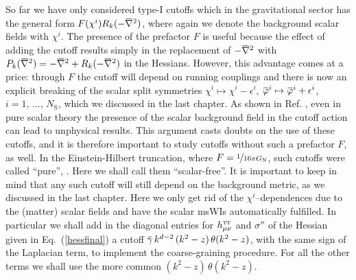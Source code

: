 \documentclass[11pt]{book} %
\newcommand{\overbar}[1]{\mkern 1.5mu\overline{\mkern-1.5mu#1\mkern-1.5mu}\mkern 1.5mu}
\newcommand\TTspace{ -1pt }
\newcommand\hTTmunu{ h^{\scriptscriptstyle{\mathrm{T\hspace{\TTspace}T}}}_{\mu\nu} }
\newcommand\NS{ N_{\scriptscriptstyle{\mathrm{S}}} }
\newcommand\GNewton{ G_{\scriptscriptstyle{\mathrm{N}}} }
\newcommand{\bnabla}{\overbar \nabla}
\newcommand{\bp}{\overbar \varphi}
\newcommand{\bg}{\overbar \gamma}
\newcommand\eg{\textit{e.g.}\ }
\numberwithin{equation}{chapter}
\begin{document}
So far we have only considered type-I cutoffs which in the gravitational
sector has the general form $F(\chi^i)R_k(-\bnabla^2)$, where again we denote
the background scalar fields with $\chi^i$.
The presence of the prefactor $F$ is useful because the effect
of adding the cutoff results simply in the replacement of
$-\bnabla^2$ with $P_k(\bnabla^2)=-\bnabla^2+R_k(-\bnabla^2)$
in the Hessians.
However, this advantage comes at a price:
through $F$ the cutoff will depend on running couplings
and there is now an explicit breaking of the scalar split symmetries
$\chi^i \mapsto \chi^i - \epsilon^i$,
$\bp ^i \mapsto \bp ^i + \epsilon^i$, $i=1,\,\dots,\,\NS$, which we discussed in the last chapter.
As shown in Ref. \cite{Bridle:2013sra}, even in pure scalar theory
the presence of the scalar background field
in the cutoff action can lead to unphysical results.
This argument casts doubts on the use of these cutoffs,
and it is therefore important to study cutoffs without
such a prefactor $F$, as well.
In the Einstein-Hilbert truncation, where $F=\nicefrac{1}{16\pi \GNewton}$,
such cutoffs were called ``pure'', \cite{Narain:2009qa}.
Here we shall call them ``scalar-free''.
It is important to keep in mind that any such cutoff will still
depend on the background metric, as we discussed in the last chapter.
Here we only get rid of the $\chi^i$--dependences due to the (matter) scalar fields
and have the scalar msWIs automatically fulfilled.
In particular we shall add in the diagonal entries for $\hTTmunu$
and $\sigma''$ of the Hessian given in Eq.~(\ref{hessfinal})
a cutoff $\bg \, k^{d-2} \, (k^2-z) \, \theta(k^2-z)$,
with the same sign of the Laplacian term, to implement the coarse-graining procedure.
For all the other terms we shall use the more common
$(k^2-z) \, \theta(k^2-z)$.
\end{document}
